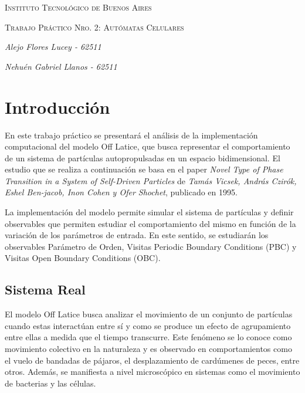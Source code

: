 \documentclass[11pt]{article}
\begin{document}
    \begin{titlepage}
        \centering

        {\scshape\Large Instituto Tecnológico de Buenos Aires \\ \par}
        \vspace{1cm}

        {\scshape\huge Trabajo Práctico Nro. 2: Autómatas Celulares \par}
        \vspace{2cm}

        {\Large\itshape Alejo Flores Lucey - 62511\par}
        {\Large\itshape Nehuén Gabriel Llanos - 62511\par}
        \vfill

    \end{titlepage}

    \section{Introducción}
        En este trabajo práctico se presentará el análisis de la implementación computacional del modelo Off Latice, que busca
        representar el comportamiento de un sistema de partículas autopropulsadas en un espacio bidimensional. El estudio que se
        realiza a continuación se basa en el paper \textit{Novel Type of Phase Transition in a System of Self-Driven Particles} de
        \textit{Tamás Vicsek, András Czirók, Eshel Ben-jacob, Inon Cohen y Ofer Shochet}, publicado en 1995.

        La implementación del modelo permite simular el sistema de partículas y definir observables que permiten estudiar el
        comportamiento del mismo en función de la variación de los parámetros de entrada. En este sentido, se estudiarán los
        observables Parámetro de Orden, Visitas Periodic Boundary Conditions (PBC) y Visitas Open Boundary Conditions (OBC).

        \subsection{Sistema Real}


            El modelo Off Latice busca analizar el movimiento de un conjunto de partículas cuando estas interactúan entre sí y
            como se produce un efecto de agrupamiento entre ellas a medida que el tiempo transcurre. Este fenómeno se lo conoce
            como movimiento colectivo en la naturaleza y es observado en comportamientos como el vuelo de bandadas de pájaros,
            el desplazamiento de cardúmenes de peces, entre otros. Además, se manifiesta a nivel microscópico en sistemas como
            el movimiento de bacterias y las células.
\end{document}

